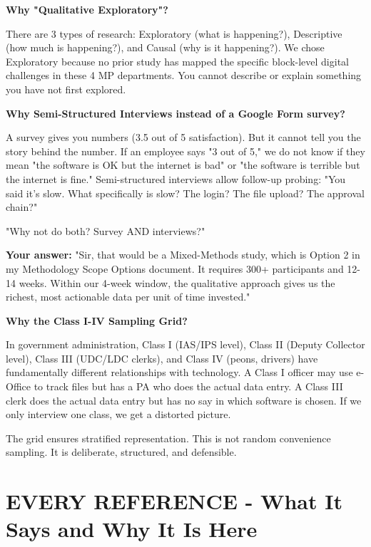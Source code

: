 \documentclass[11pt,a4paper]{article}
\begin{document}
\begin{abox}
\textbf{Why "Qualitative Exploratory"?}

There are 3 types of research: Exploratory (what is happening?), Descriptive (how much is happening?), and Causal (why is it happening?). We chose Exploratory because no prior study has mapped the specific block-level digital challenges in these 4 MP departments. You cannot describe or explain something you have not first explored.

\textbf{Why Semi-Structured Interviews instead of a Google Form survey?}

A survey gives you numbers (3.5 out of 5 satisfaction). But it cannot tell you the story behind the number. If an employee says "3 out of 5," we do not know if they mean "the software is OK but the internet is bad" or "the software is terrible but the internet is fine." Semi-structured interviews allow follow-up probing: "You said it's slow. What specifically is slow? The login? The file upload? The approval chain?"

\begin{qbox}
"Why not do both? Survey AND interviews?"
\end{qbox}

\textbf{Your answer:} "Sir, that would be a Mixed-Methods study, which is Option 2 in my Methodology Scope Options document. It requires 300+ participants and 12-14 weeks. Within our 4-week window, the qualitative approach gives us the richest, most actionable data per unit of time invested."
\end{abox}

\begin{abox}
\textbf{Why the Class I-IV Sampling Grid?}

In government administration, Class I (IAS/IPS level), Class II (Deputy Collector level), Class III (UDC/LDC clerks), and Class IV (peons, drivers) have fundamentally different relationships with technology. A Class I officer may use e-Office to track files but has a PA who does the actual data entry. A Class III clerk does the actual data entry but has no say in which software is chosen. If we only interview one class, we get a distorted picture.

The grid ensures stratified representation. This is not random convenience sampling. It is deliberate, structured, and defensible.
\end{abox}

\section{EVERY REFERENCE - What It Says and Why It Is Here}
\end{document}
